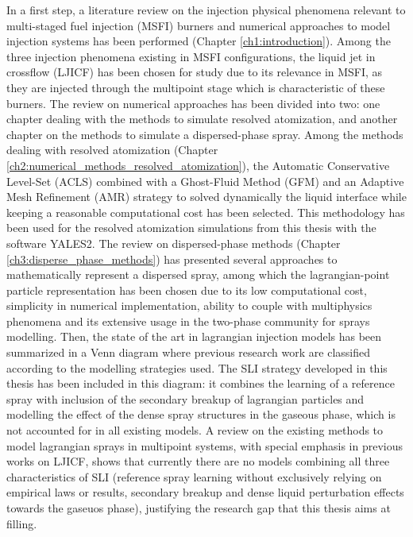 In a first step, a literature review on the injection physical phenomena relevant to multi-staged fuel injection (MSFI) burners and numerical approaches to model injection systems has been performed (Chapter \ref{ch1:introduction}). Among the three injection phenomena existing in MSFI configurations, the liquid jet in crossflow (LJICF) has been chosen for study due to its relevance in MSFI, as they are injected through the multipoint stage which is characteristic of these burners. The review on numerical approaches has been divided into two: one chapter dealing with the methods to simulate resolved atomization, and another chapter on the methods to simulate a dispersed-phase spray. Among the methods dealing with resolved atomization (Chapter \ref{ch2:numerical_methods_resolved_atomization}), the Automatic Conservative Level-Set (ACLS) combined with a Ghost-Fluid Method (GFM) and an Adaptive Mesh Refinement (AMR) strategy to solved dynamically the liquid interface while keeping a reasonable computational cost has been selected. This methodology has been used for the resolved atomization simulations from this thesis with the software YALES2. The review on dispersed-phase methods (Chapter \ref{ch3:disperse_phase_methods}) has presented several approaches to mathematically represent a dispersed spray, among which the lagrangian-point particle representation has been chosen due to its low computational cost, simplicity in numerical implementation, ability to couple with multiphysics phenomena and its extensive usage in the two-phase community for sprays modelling. Then, the state of the art in lagrangian injection models has been summarized in a Venn diagram where previous research work are classified according to the modelling strategies used. The SLI strategy developed in this thesis has been included in this diagram: it combines the learning of a reference spray with inclusion of the secondary breakup of lagrangian particles and modelling the effect of the dense spray structures in the gaseous phase, which is not accounted for in all existing models. A review on the existing methods to model lagrangian sprays in multipoint systems, with special emphasis in previous works on LJICF, shows that currently there are no models combining all three characteristics of SLI (reference spray learning without exclusively relying on empirical laws or results, secondary breakup and dense liquid perturbation effects towards the gaseuos phase), justifying the research gap that this thesis aims at filling.

